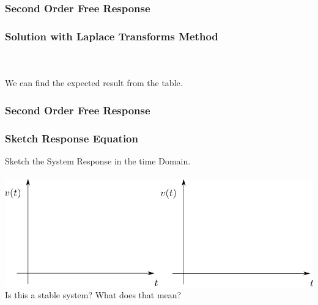 \documentclass[fleqn]{beamer} %
\newcommand{\sectionIsubsectionItitle}{Second Order Free Response}
\begin{document}
			\begin{frame}
				\frametitle{\sectionIsubsectionItitle}
				\bigskip

				  \frametitle{Solution with Laplace Transforms Method}



						  \vspace{3mm}\\

						 \vspace{8mm}\\

					\large We can find the expected result from the table. \vspace{5mm}\\


				\btVFill
			\end{frame}


			\begin{frame}
				\frametitle{\sectionIsubsectionItitle}
				\bigskip

				 \frametitle{Sketch Response Equation}

				\large Sketch the System Response in the time Domain.  \vspace{3mm}\\

				  \vspace{3mm}\\

				\includegraphics[scale=0.5]{images/lecture1_fig1.png} \\

				\large Is this a stable system? What does that mean?\\


				\btVFill
			\end{frame}
\end{document}
